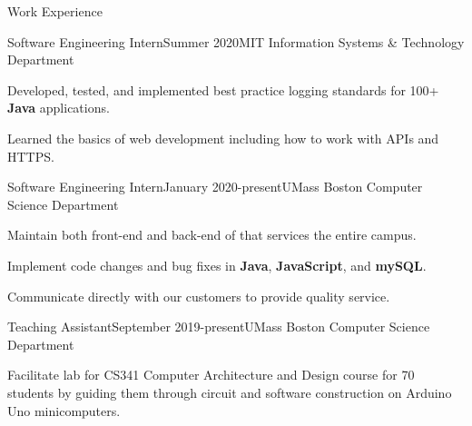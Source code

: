 \documentclass{resume} %
\begin{document}
\begin{Section}{Work Experience}
	
	\begin{Job}{Software Engineering Intern}{Summer 2020}{MIT Information Systems \& Technology Department}
			\item Developed, tested, and implemented best practice logging standards for 100+ \textbf{Java} applications.
			\item Learned the basics of web development including how to work with APIs and HTTPS.
	\end{Job}
	
	\begin{Job}{Software Engineering Intern}{January 2020-present}{UMass Boston Computer Science Department}
			\item Maintain both front-end and back-end of  that services the entire campus.
			\item Implement code changes and bug fixes in \textbf{Java}, \textbf{JavaScript}, and \textbf{mySQL}.
			\item Communicate directly with our customers to provide quality service.

	\end{Job}
	
	\begin{Job}{Teaching Assistant}{September 2019-present}{UMass Boston Computer Science Department}
			\item Facilitate lab for CS341 Computer Architecture and Design course for 70 students by guiding them through circuit and software construction on Arduino Uno minicomputers.
	\end{Job}
	
	

\end{Section}
\end{document}
